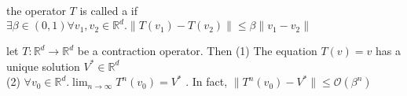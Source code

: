 
\begin{deff}
 the operator $T$ is called a  if $\exists \beta \in (0,1) \forall v_1, v_2 \in \mathbb{R}^d . \|T(v_1) - T(v_2)\| \leq \beta\|v_1 - v_2\|$\end{deff}

\begin{thm} let $T: \mathbb{R}^d \rightarrow \mathbb{R}^d$ be a contraction operator. Then
{\color{blue}(1)} The equation $T(v) = v$ has a unique solution $V^{*} \in \mathbb{R}^d$\\
    {\color{blue}(2)}  $\forall v_0 \in \mathbb{R}^d . \lim_{n\rightarrow\infty} T^n(v_0) = V^{*}$ . In fact, $\|T^n(v_0) - V^{*}\| \leq \mathcal{O}(\beta^n)$
\end{thm}
